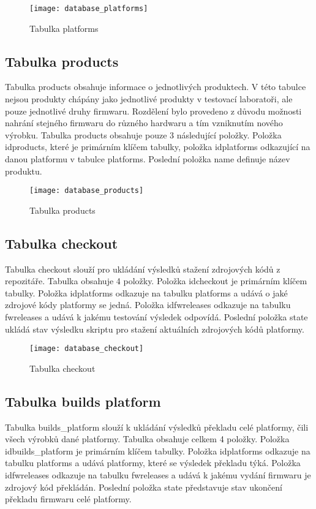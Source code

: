 \begin{figure}[h]
  \centering
  \texttt{[image: database\_platforms]}
  \caption{Tabulka platforms}
  \label{fig:database_platforms}
\end{figure}

\subsection{Tabulka products}
Tabulka products obsahuje informace o jednotlivých produktech. V této tabulce nejsou produkty chápány jako jednotlivé produkty v testovací laboratoři, ale pouze jednotlivé druhy firmwaru. Rozdělení bylo provedeno z důvodu možnosti nahrání stejného firmwaru do různého hardwaru a tím vzniknutím nového výrobku. Tabulka products obsahuje pouze 3 následující položky. Položka idproducts, které je primárním klíčem tabulky, položka idplatforms odkazující na danou platformu v tabulce platforms. Poslední položka name definuje název produktu.

\begin{figure}[h]
  \centering
  \texttt{[image: database\_products]}
  \caption{Tabulka products}
  \label{fig:database_products}
\end{figure}

\subsection{Tabulka checkout}
Tabulka checkout slouží pro ukládání výsledků stažení zdrojových kódů z repozitáře. Tabulka obsahuje 4 položky. Položka idcheckout je primárním klíčem tabulky. Položka idplatforms odkazuje na tabulku platforms a udává o jaké zdrojové kódy platformy se jedná. Položka idfwreleases odkazuje na tabulku fwreleases a udává k jakému testování výsledek odpovídá. Poslední položka state ukládá stav výsledku skriptu pro stažení aktuálních zdrojových kódů platformy.

\begin{figure}[h]
  \centering
  \texttt{[image: database\_checkout]}
  \caption{Tabulka checkout}
  \label{fig:database_checkout}
\end{figure}

\subsection{Tabulka builds platform}
Tabulka builds\_platform slouží k ukládání výsledků překladu celé platformy, čili všech výrobků dané platformy. Tabulka obsahuje celkem 4 položky. Položka idbuilds\_platform je primárním klíčem tabulky. Položka idplatforms odkazuje na tabulku platforms a udává platformy, které se výsledek překladu týká. Položka idfwreleases odkazuje na tabulku fwreleases a udává k jakému vydání firmwaru je zdrojový kód překládán. Poslední položka state představuje stav ukončení překladu firmwaru celé platformy.

